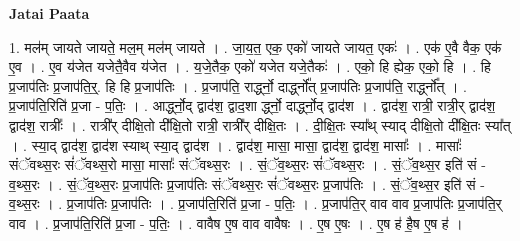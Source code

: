\documentclass[17pt]{extarticle}
\begin{document}
\textbf{Jatai Paata} \newline

1. मल॑म् जायते जायते॒ मल॒म् मल॑म् जायते । . जा॒य॒त॒ एक॒ एको॑ जायते जायत॒ एकः॑ । . एक॑ ए॒वै वैक॒ एक॑ ए॒व । . ए॒व य॑जेत यजेतै॒वैव य॑जेत । . य॒जे॒तैक॒ एको॑ यजेत यजे॒तैकः॑ । . एको॒ हि ह्येक॒ एको॒ हि । . हि प्र॒जाप॑तिः प्र॒जाप॑ति॒र्॒. हि हि प्र॒जाप॑तिः । . प्र॒जाप॑ति॒ रार्द्ध्नो॒ दार्द्ध्नो᳚त् प्र॒जाप॑तिः प्र॒जाप॑ति॒ रार्द्ध्नो᳚त् । . प्र॒जाप॑ति॒रिति॑ प्र॒जा - प॒तिः॒ । . आर्द्ध्नो॒द् द्वाद॑श॒ द्वाद॒शा र्द्ध्नो॒ दार्द्ध्नो॒द् द्वाद॑श । . द्वाद॑श॒ रात्री॒ रात्री॒र् द्वाद॑श॒ द्वाद॑श॒ रात्रीः᳚ । . रात्री᳚र् दीक्षि॒तो दी᳚क्षि॒तो रात्री॒ रात्री᳚र् दीक्षि॒तः । . दी॒क्षि॒तः स्या᳚थ् स्याद् दीक्षि॒तो दी᳚क्षि॒तः स्या᳚त् । . स्या॒द् द्वाद॑श॒ द्वाद॑श स्याथ् स्या॒द् द्वाद॑श । . द्वाद॑श॒ मासा॒ मासा॒ द्वाद॑श॒ द्वाद॑श॒ मासाः᳚ । . मासाः᳚ संॅवथ्स॒रः सं॑ॅवथ्स॒रो मासा॒ मासाः᳚ संॅवथ्स॒रः । . सं॒ॅव॒थ्स॒रः सं॑ॅवथ्स॒रः । . सं॒ॅव॒थ्स॒र इति॑ सं - व॒थ्स॒रः । . सं॒ॅव॒थ्स॒रः प्र॒जाप॑तिः प्र॒जाप॑तिः संॅवथ्स॒रः सं॑ॅवथ्स॒रः प्र॒जाप॑तिः । . सं॒ॅव॒थ्स॒र इति॑ सं - व॒थ्स॒रः । . प्र॒जाप॑तिः प्र॒जाप॑तिः । . प्र॒जाप॑ति॒रिति॑ प्र॒जा - प॒तिः॒ । . प्र॒जाप॑ति॒र् वाव वाव प्र॒जाप॑तिः प्र॒जाप॑ति॒र् वाव । . प्र॒जाप॑ति॒रिति॑ प्र॒जा - प॒तिः॒ । . वावैष ए॒ष वाव वावैषः । . ए॒ष ए॒षः । . ए॒ष ह॑ है॒ष ए॒ष ह॑ । \newline
\end{document}
